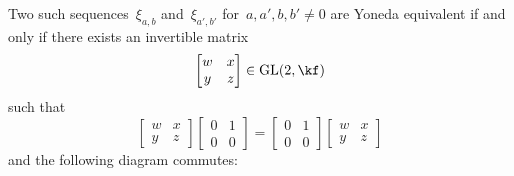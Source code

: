 \documentclass[a4paper, 11pt, twoside=semi]{scrartcl}
\begin{document}
Two such sequences~$\xi_{a,b}$ and~$\xi_{a',b'}$ for~$a, a', b, b' \neq 0$ are Yoneda equivalent if and only if there exists an invertible matrix
\[
  \begin{bmatrix}
    w & x \\
    y & z
  \end{bmatrix}
  \in
  \GL(2, \kf)
\]
such that
\begin{equation}
  \label{matrix is a homomorphism}
  \begin{bmatrix}
    w & x \\
    y & z
  \end{bmatrix}
  \begin{bmatrix}
    0 & 1 \\
    0 & 0
  \end{bmatrix}
  =
  \begin{bmatrix}
    0 & 1 \\
    0 & 0
  \end{bmatrix}
  \begin{bmatrix}
    w & x \\
    y & z
  \end{bmatrix}
\end{equation}
and the following diagram commutes:
\end{document}
